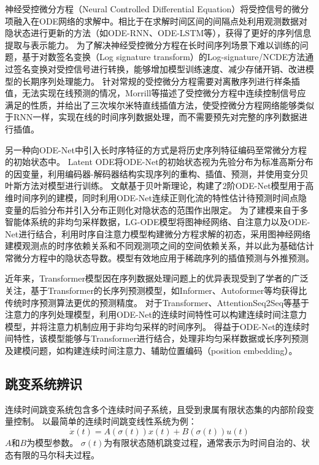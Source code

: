 神经受控微分方程（Neural Controlled Differential Equation）\cite{kidger2020neural}将受控信号的微分项融入在ODE网络的求解中。相比于在求解时间区间的间隔点处利用观测数据对隐状态进行更新的方法（如ODE-RNN、ODE-LSTM等），获得了更好的序列信息提取与表示能力。
为了解决神经受控微分方程在长时间序列场景下难以训练的问题，基于对数签名变换（Log signature transform）的Log-signature/NCDE方法\cite{morrill2021neural}通过签名变换对受控信号进行转换，能够增加模型训练速度、减少存储开销、改进模型的长期序列处理能力。
针对常规的受控微分方程需要对离散序列进行样条插值，无法实现在线预测的情况，Morrill等\cite{morrill2021online}描述了受控微分方程中连续控制信号应满足的性质，并给出了三次埃尔米特直线插值方法，使受控微分方程网络能够类似于RNN一样，实现在线的时间序列数据处理，而不需要预先对完整的序列数据进行插值。

另一种向ODE-Net中引入长时序特征的方式是将历史序列特征编码至常微分方程的初始状态中。
Latent ODE\cite{10.5555/3454287.3454765}将ODE-Net的初始状态视为先验分布为标准高斯分布的因变量，利用编码器-解码器结构实现序列的重构、插值、预测，并使用变分贝叶斯方法对模型进行训练。
文献\cite{Yildiz2019}基于贝叶斯理论，构建了2阶ODE-Net模型用于高维时间序列的建模，同时利用ODE-Net连续正则化流的特性估计待预测时间点隐变量的后验分布并引入分布正则化对隐状态的范围作出限定。
为了建模来自于多智能体系统的非均匀采样数据，LG-ODE模型\cite{Huang2020}将图神经网络、自注意力以及ODE-Net进行结合，利用时序自注意力模型构建微分方程求解的初态，采用图神经网络建模观测点的时序依赖关系和不同观测项之间的空间依赖关系，并以此为基础估计常微分方程中的隐状态导数。模型有效地应用于稀疏序列的插值预测与外推预测。

近年来，Transformer模型\cite{Vaswani2017}因在序列数据处理问题上的优异表现受到了学者的广泛关注，基于Transformer的长序列预测模型，如Informer\cite{Zhou2020}、Autoformer\cite{Wu2021}等均获得比传统时序预测算法更优的预测精度。
对于Transformer、AttentionSeq2Seq等基于注意力的序列处理模型，利用ODE-Net的连续时间特性可以构建连续时间注意力模型\cite{chen2021continuous}，并将注意力机制应用于非均匀采样的时间序列。
得益于ODE-Net的连续时间特性，该模型能够与Transformer进行结合，处理非均匀采样数据或长序列预测及建模问题，如构建连续时间注意力\cite{chen2021continuous}、辅助位置编码（position embedding）\cite{Liu2020}。


\subsection{跳变系统辨识}
连续时间跳变系统包含多个连续时间子系统，且受到隶属有限状态集的内部阶段变量控制\cite{8709809}。
以最简单的连续时间跳变线性系统\cite{fang2002stabilization}为例：
\begin{equation}
    \dot{x}(t)=A(\sigma(t)) x(t)+B(\sigma(t)) u(t)
\end{equation}
$A$和$B$为模型参数。
$\sigma(t)$为有限状态随机跳变过程，通常表示为时间自治的、状态有限的马尔科夫过程。

